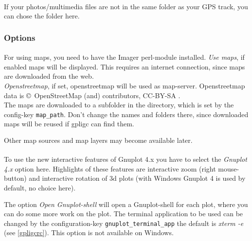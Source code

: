 \paragraph{%
}
If your photos/multimedia files are not in the same folder as your GPS track, you can chose the folder here.



\subsubsection{Options}

\paragraph{%
}
For using maps, you need to have the Imager perl-module installed.
\emph{Use maps}, if enabled maps will be displayed.
This requires an internet connection, since maps are downloaded from the web.\\
\emph{Openstreetmap}, if set, openstreetmap will be used as map-server.
Openstreetmap data is \copyright\ OpenStreetMap (and) contributors, CC-BY-SA \cite{osm}.\\

The maps are downloaded to a subfolder in the directory, which is set by the config-key \texttt{map\_path}.
Don't change the names and folders there, since downloaded maps will be reused if gpligc can find them.

Other map sources and map layers may become available later.


\paragraph{
}
To use the new interactive features of Gnuplot 4.x you have to select the \emph{Gnuplot 4.x} option here. Highlights of these features are interactive zoom (right mouse-button) and interactive rotation of 3d plots (with Windows Gnuplot 4 is used by default, no choice here).

The option \emph{Open Gnuplot-shell} will open a Gnuplot-shell for each plot, where you can do some more work on the plot. The  terminal application to be used can be changed by the configuration-key \texttt{gnuplot\_terminal\_app} the default is \emph{xterm -e} (see \ref{gpligcrc}).
This option is not available on Windows.


